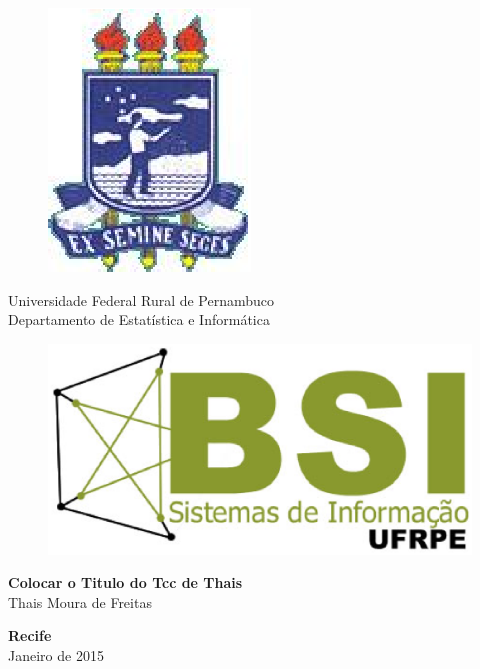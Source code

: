 \begin{figure}[h]
\leavevmode
\begin{minipage}{\textwidth}
\includegraphics[scale=0.7]
{prefacios/capa/logo-ufrpe.eps}
\end{minipage}
\end{figure}
\vspace{-3.5cm}
{\bf
\begin{center}
{\Large
\hspace*{0cm}Universidade Federal Rural de Pernambuco \\
\hspace*{0cm}Departamento de Estatística e Informática}\\
\end{center}
}
\noindent
\begin{figure}[h]
\centering
\includegraphics[scale=0.5]{prefacios/capa/logo-bsi-presencial-v3-amp.eps}
\end{figure}


\vspace{2.5cm}
\noindent
\begin{center}
{\Large \bf Colocar o Titulo do Tcc de Thais} \\[5cm]
{\Large Thais Moura de Freitas}\\[6mm]
\end{center}


\vspace{1.5cm}
\begin{center}
{\large {\bf Recife}\\[6mm]
Janeiro de 2015}
\end{center}
\newpage
